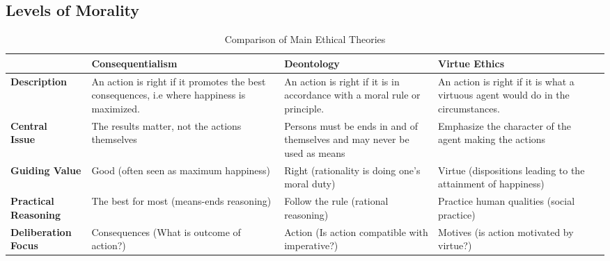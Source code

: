 \documentclass[twocolumn]{article}
\begin{document}
\subsection{Levels of Morality}\label{sec:levels}
 









\begin{table*}[t]
\centering
\caption{Comparison of Main Ethical Theories}\label{table:ethics}
\begin{tabular}{|M{1.8cm}|M{4.8cm}|M{4.8cm}|M{4.8cm}|N} \hline
&\textbf{Consequentialism}&\textbf{Deontology}&\textbf{Virtue Ethics}&\\[10pt] \hline
\textbf{Description}& An action is right if it promotes the best consequences, i.e where happiness is maximized.& An action is right if it is in accordance with a moral rule or principle. %
 & An action is right if it is what a virtuous agent would do in the circumstances.  &\\[10pt] \hline
\textbf{Central \newline Issue} & The results matter, not the actions themselves & Persons must be ends in and of themselves and may never be used as means & Emphasize the character of the agent making the actions &\\[10pt] \hline
\textbf{Guiding Value}& Good (often seen as maximum happiness) & Right (rationality is doing one's moral duty) & Virtue (dispositions leading to the attainment of happiness) &\\[10pt] \hline
\textbf{Practical \newline Reasoning} & The best for most (means-ends reasoning)& Follow the rule 
(rational reasoning) & Practice human qualities (social practice)&\\[10pt] \hline
\textbf{Deliberation Focus} & Consequences (What is outcome of action?) & Action (Is action compatible with imperative?) & Motives (is action motivated by virtue?) &\\[10pt] \hline
\end{tabular}
\end{table*}
\end{document}
